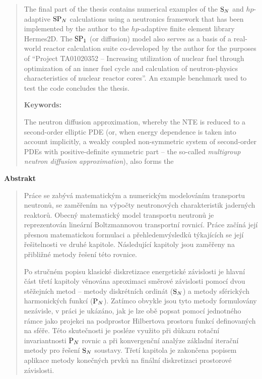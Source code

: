 \begin{alwayssingle}
\begin{quote}
The final part of the thesis contains numerical examples of the $\SN$ and $hp$-adaptive $\SPN$ calculations using a
neutronics framework that has been implemented by the author to the $hp$-adaptive finite element library Hermes2D. The $\SPN[1]$
(or diffusion) model also serves as a basis of a real-world reactor calculation suite co-developed by the author for the
purposes of ``Project TA01020352 -- Increasing utilization of nuclear fuel through optimization of an inner fuel cycle and
calculation of neutron-physics characteristics of nuclear reactor cores''. An example benchmark used to test the code
concludes the thesis.
 

\vspace*{1cm}
{\large \bfseries  Keywords:}

The neutron diffusion approximation, whereby the NTE is reduced to a second-order elliptic PDE (or, when energy
dependence is taken into account implicitly, a weakly coupled non-symmetric system of second-order PDEs with
positive-definite symmetric part -- the so-called \textit{multigroup neutron diffusion approximation}), also forms the

\end{quote}

\clearpage
{}
  \begin{center}
  \vspace*{1.5cm}
  {\Large \bfseries  Abstrakt}
  \end{center}
  \vspace{0.5cm}
\begin{quote}

Práce se zabývá matematickým a numerickým modelováním transportu neutronů, se zaměřením na výpočty neutronových
charakteristik jaderných reaktorů. Obecný matematický model transportu neutronů je reprezentován lineární Boltzmannovou
transportní rovnicí. Práce začíná její přesnou matematickou formulaci a přehledem\linebreak výsledků týkajících se její
řešitelnosti ve druhé kapitole. Následující kapitoly jsou zaměřeny na přibližné metody řešení této rovnice.

Po stručném popisu klasické diskretizace energetické závislosti je hlavní část třetí kapitoly věnována aproximaci
směrové závislosti pomocí dvou stěžejních metod -- metody diskrétních ordinát ($\SN$) a metody sférických harmonických
funkcí ($\PN$). Zatímco obvykle jsou tyto metody formulovány nezávisle, v práci je ukázáno, jak je lze obě popsat pomocí
jednotného rámce jako projekci na podprostor Hilbertova prostoru funkcí definovaných na sféře. Této skutečnosti je
posléze využito při důkazu rotační invariantnosti $\PN$ rovnic a při konvergenční analýze základní iterační
metody pro řešení $\SN$ soustavy.
Třetí kapitola je zakončena popisem aplikace metody konečných prvků na finální diskretizaci prostorové závislosti.


\end{quote}
\end{alwayssingle}
